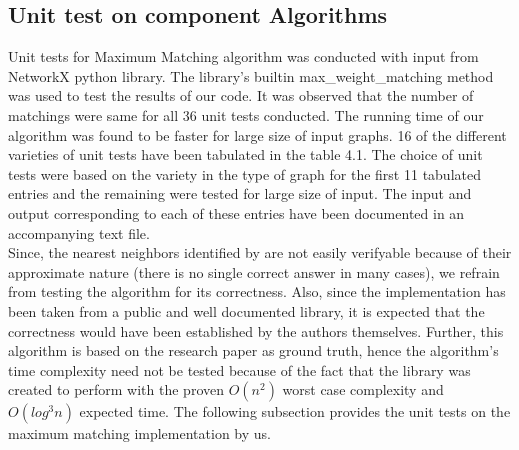 \documentclass[12pt, a4paper]{article}
\begin{document}
\subsection{Unit test on component Algorithms}
Unit tests for Maximum Matching algorithm was conducted with input from NetworkX python library. The library's builtin max\_weight\_matching method was used to test the results of our code. It was observed that the number of matchings were same for all 36 unit tests conducted. The running time of our algorithm was found to be faster for large size of input graphs. 16 of the different varieties of unit tests have been tabulated in the table 4.1. The choice of unit tests were based on the variety in the type of graph for the first 11 tabulated entries and the remaining were tested for large size of input. The input and output corresponding to each of these entries have been documented in an accompanying text file.\\
Since, the nearest neighbors identified by \cite{ANN} are not easily verifyable because of their approximate nature (there is no single correct answer in many cases), we refrain from testing the algorithm for its correctness. Also, since the implementation has been taken from a public and well documented library, it is expected that the correctness would have been established by the authors themselves. Further, this algorithm is based on the research paper \cite{ANN} as ground truth, hence the algorithm's time complexity need not be tested because of the fact that the library was created to perform with the proven $O(n^2)$ worst case complexity and $O(log^3 n)$ expected time. The following subsection provides the unit tests on the maximum matching implementation by us.
\end{document}
